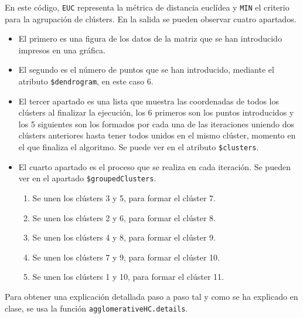 \documentclass[12pt]{report}\usepackage[]{graphicx}\usepackage[dvipsnames]{xcolor}
\begin{document}
				En este código, \texttt{EUC} representa la métrica de distancia euclídea y \texttt{MIN} el criterio para la agrupación de clústers. En la salida se pueden observar cuatro apartados.
				
				\begin{itemize}
					\item El primero es una figura de los datos de la matriz que se han introducido impresos en una gráfica.
					
					\item El segundo es el número de puntos que se han introducido, mediante el atributo \texttt{\$dendrogram}, en este caso 6.
					
					\item El tercer apartado es una lista que muestra las coordenadas de todos los clústers al finalizar la ejecución, los 6 primeros son los puntos introducidos y los 5 siguientes son los formados por cada una de las iteraciones uniendo dos clústers anteriores hasta tener todos unidos en el mismo clúster, momento en el que finaliza el algoritmo. Se puede ver en el atributo \texttt{\$clusters}.
					
					\item El cuarto apartado es el proceso que se realiza en cada iteración. Se pueden ver en el apartado \texttt{\$groupedClusters}.
					
					\begin{enumerate}[label = \textbf{\arabic*.}]
						\item Se unen los clústers 3 y 5, para formar el clúster 7.
						\item Se unen los clústers 2 y 6, para formar el clúster 8.
						\item Se unen los clústers 4 y 8, para formar el clúster 9.
						\item Se unen los clústers 7 y 9, para formar el clúster 10.
						\item Se unen los clústers 1 y 10, para formar el clúster 11.
					\end{enumerate}
					
				\end{itemize}
				
				Para obtener una explicación detallada paso a paso tal y como se ha explicado en clase, se usa la función \texttt{agglomerativeHC.details}.
				
\end{document}

